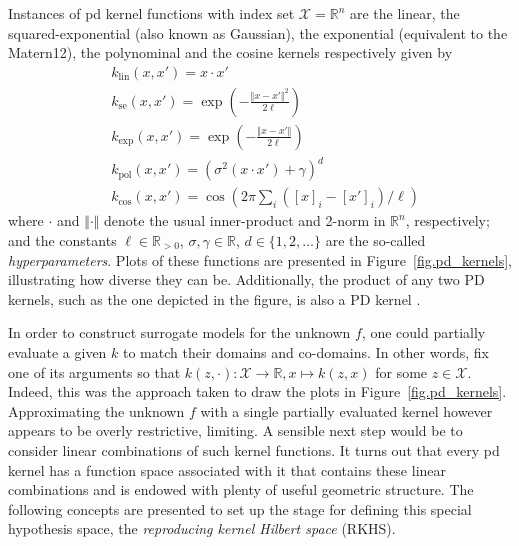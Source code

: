 Instances of \ac{pd} kernel functions with index set $\mathcal{X} = \mathbb{R}^n$ are the linear, the squared-exponential (also known as Gaussian), the exponential (equivalent to the Matern12), the polynominal and the cosine kernels respectively given by
\begin{align}
	&k_\text{lin}(x,x') = x \cdot x' \\
	&k_\text{se}(x,x') = \exp\left(-\frac{\Vert x-x'\Vert^2}{2\ell}\right) \label{eq.se_kernel}\\
	&k_\text{exp}(x,x') = \exp\left(-\frac{\Vert x-x'\Vert}{2\ell}\right) \\
	&k_\text{pol}(x,x') = \left(\sigma^2 (x \cdot x') + \gamma \right)^d \\
	&k_\text{cos}(x,x') = \cos\left(2\pi \sum_i ([x]_i-[x']_i)/\ell \right)
\end{align}
where $\cdot$ and $\Vert \cdot \Vert$ denote the usual inner-product  and 2-norm in $\mathbb{R}^n$, respectively; and the constants $\ell \in \mathbb{R}_{>0}$, $\sigma, \gamma\in \mathbb{R}$, $d \in \{1,2,\dots\}$ are the so-called \textit{hyperparameters}. Plots of these functions are presented in Figure~\ref{fig.pd_kernels}, illustrating how diverse they can be. Additionally, the product of any two PD kernels, such as the one depicted in the figure, is also a PD kernel \citep{scholkopf2002learning}. %

In order to construct surrogate models for the unknown $f$, one could partially evaluate a given $k$ to match their domains and co-domains. In other words, fix one of its arguments so that $k(z,\cdot): \mathcal{X} \rightarrow \mathbb{R}, x \mapsto k(z,x)$ for some $z \in \mathcal{X}$. Indeed, this was the approach taken to draw the plots in Figure~\ref{fig.pd_kernels}. Approximating the unknown $f$ with a single partially evaluated kernel however appears to be overly restrictive, limiting. A sensible next step would be to consider linear combinations of such kernel functions. It turns out that every \ac{pd} kernel has a function space associated with it that contains these linear combinations and is endowed with plenty of useful geometric structure. The following concepts are presented to set up the stage for defining this special hypothesis space, the \textit{reproducing kernel Hilbert space} (RKHS).

